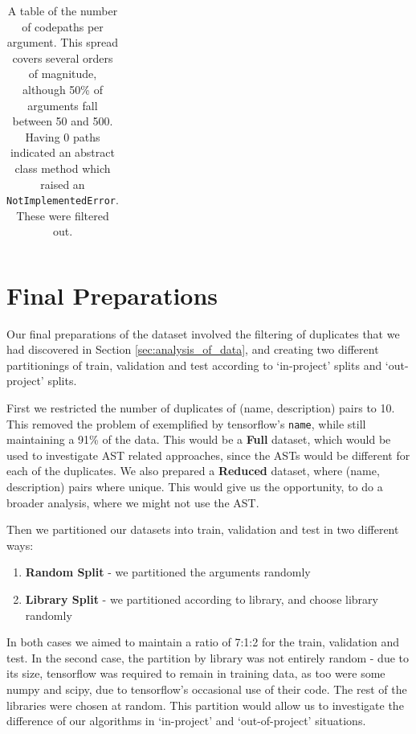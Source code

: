 \begin{table}[p]
\begin{tabular}{c | c | c  }
    \end{tabular}
    \caption {A table of the number of codepaths per argument. This spread covers several orders of magnitude, although 50\% of arguments fall between 50 and 500. Having 0 paths indicated an abstract class method which raised an \texttt{NotImplementedError}. These were filtered out. }
    \label{table:paths_per_point} 

\end{table}


\section{Final Preparations} %
\label{sec:final_preparations}

Our final preparations of the dataset involved the filtering of duplicates that we had discovered in Section \ref{sec:analysis_of_data}, and creating two different partitionings of train, validation and test according to `in-project' splits and `out-project' splits.

First we restricted the number of duplicates of (name, description) pairs to 10. This removed the problem of exemplified by tensorflow's \texttt{name}, while still maintaining a 91\% of the data. This would be a \textbf{Full} dataset, which would be used to investigate AST related approaches, since the ASTs would be different for each of the duplicates.
We also prepared a \textbf{Reduced} dataset, where (name, description) pairs where unique. This would give us the opportunity, to do a broader analysis, where we might not use the AST.

Then we partitioned our datasets into train, validation and test in two different ways:
\begin{enumerate}
    \item \textbf{Random Split} - we partitioned the arguments randomly
    \item \textbf{Library Split} - we partitioned according to library, and choose library randomly
\end{enumerate}

In both cases we aimed to maintain a ratio of 7:1:2 for the train, validation and test. In the second case, the partition by library was not entirely random - due to its size, tensorflow was required to remain in training data, as too were some numpy and scipy, due to tensorflow's occasional use of their code. The rest of the libraries were chosen at random. This partition would allow us to investigate the difference of our algorithms in `in-project' and `out-of-project' situations.

